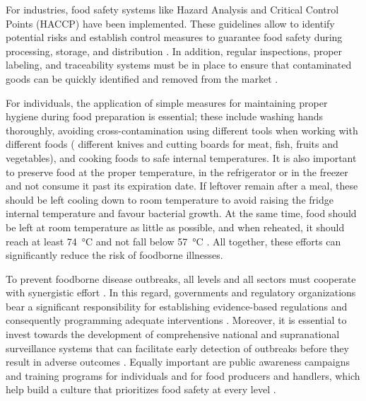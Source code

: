 For industries, food safety systems like Hazard Analysis and Critical Control Points (HACCP) have been implemented. These guidelines allow to identify potential risks and establish control measures to guarantee food safety during processing, storage, and distribution \citep{faowhoFAO2006,wallaceHACCP2014}. In addition, regular inspections, proper labeling, and traceability systems must be in place to ensure that contaminated goods can be quickly identified and removed from the market \citep{programFood2024,ISO2018}.

For individuals, the application of simple measures for maintaining proper hygiene during food preparation is essential; these include washing hands thoroughly, avoiding cross-contamination using different tools when working with different foods (\eg{} different knives and cutting boards for meat, fish, fruits and vegetables), and cooking foods to safe internal temperatures.
It is also important to preserve food at the proper temperature, \eg{} in the refrigerator or in the freezer and not consume it past its expiration date. If leftover remain after a meal, these should be left cooling down to room temperature to avoid raising the fridge internal temperature and favour bacterial growth. At the same time, food should be left at room temperature as little as possible, and when reheated, it should reach at least \SI{74}{\degreeCelsius} and not fall below \SI{57}{\degreeCelsius} \citep{whoFive2006,cdcFour2024,efsaHandling}. All together, these efforts can significantly reduce the risk of foodborne illnesses.

To prevent foodborne disease outbreaks, all levels and all sectors must cooperate with synergistic effort \citep{graceFood2017}. In this regard, governments and regulatory organizations bear a significant responsibility for establishing evidence-based regulations and consequently programming adequate interventions \citep{faoWorking2007}. Moreover, it is essential to invest towards the development of comprehensive national and supranational surveillance systems that can facilitate early detection of outbreaks before they result in adverse outcomes \citep{faoCodex2009}. Equally important are public awareness campaigns and training programs for individuals and for food producers and handlers, which help build a culture that prioritizes food safety at every level \citep{bosmanExpertise2016}.
